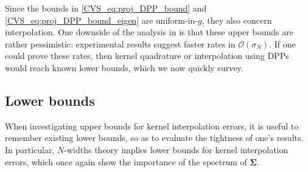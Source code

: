 \documentclass[twoside,11pt]{book}
\numberwithin{theorem}{chapter}
\numberwithin{definition}{chapter}
\numberwithin{proposition}{chapter}
\numberwithin{corollary}{chapter}
\numberwithin{example}{chapter}
\numberwithin{lemma}{chapter}
\newcommand{\pc}[1]{\textcolor{blue}{#1}}
\begin{document}
Since the bounds in \eqref{CVS_eq:proj_DPP_bound} and \eqref{CVS_eq:proj_DPP_bound_eigen} are uniform-in-$g$, they also concern interpolation. One downside of the analysis in \citep{BeBaCh19} is that these upper bounds are rather pessimistic: experimental results suggest faster rates in $\mathcal{O}(\sigma_{N})$. If one could prove these rates, then kernel quadrature or interpolation using DPPs would reach known lower bounds, which we now quickly survey.



\subsection{Lower bounds}\label{CVS_sec:lower_bounds}
When investigating upper bounds for kernel interpolation errors, it is useful to remember existing lower bounds, so as to evaluate the tightness of one's results. In particular, $N$-widths theory \citep{Pin12} implies lower bounds for kernel interpolation errors, which once again show the importance of the spectrum of $\bm{\Sigma}$.
\end{document}
